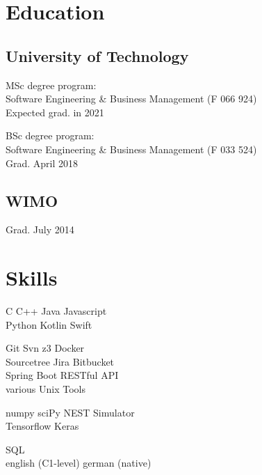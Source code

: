 \documentclass[]{resume}
\begin{document}
\begin{minipage}[t]{0.33\textwidth} 
\section{Education} 

	\subsection{University of Technology}
		MSc degree program: \\
		Software Engineering \& Business Management (F 066 924)\\
		Expected grad. in 2021
		\sectionsep

		BSc degree program: \\
		Software Engineering \& Business Management (F 033 524)\\
		Grad. April 2018
	\sectionsep

	\subsection{WIMO}
		Grad. July 2014
	\sectionsep

\section{Skills}
	C \textbullet{} C++ \textbullet{} Java \textbullet{} Javascript \\ Python \textbullet{} Kotlin \textbullet{} Swift \\ \sectionsep 
	
	Git \textbullet{} Svn \textbullet{} z3 \textbullet{} Docker \\ Sourcetree \textbullet{} Jira \textbullet{} Bitbucket \\ Spring Boot \textbullet{} RESTful API \\
	various Unix Tools \\ \sectionsep 
	
	numpy \textbullet{} sciPy \textbullet{} NEST Simulator \\ 
	Tensorflow  \textbullet{} Keras \\\sectionsep 
	
	SQL\\ \sectionsep 
	english (C1-level) \textbullet{} german (native)
	
\end{minipage}\quad %
\end{document}
